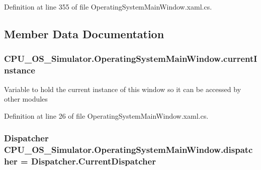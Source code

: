 Definition at line 355 of file Operating\+System\+Main\+Window.\+xaml.\+cs.



\subsection{Member Data Documentation}
\hypertarget{class_c_p_u___o_s___simulator_1_1_operating_system_main_window_ac659b34226b30276331daba60ec7d439}{}
\subsubsection[{current\+Instance}]{ C\+P\+U\+\_\+\+O\+S\+\_\+\+Simulator.\+Operating\+System\+Main\+Window.\+current\+Instance\hspace{0.3cm}{\ttfamily [static]}}\label{class_c_p_u___o_s___simulator_1_1_operating_system_main_window_ac659b34226b30276331daba60ec7d439}


Variable to hold the current instance of this window so it can be accessed by other modules 



Definition at line 26 of file Operating\+System\+Main\+Window.\+xaml.\+cs.

\hypertarget{class_c_p_u___o_s___simulator_1_1_operating_system_main_window_ac0f8e9dfcaba558927c53e11815fb0fb}{}
\subsubsection[{dispatcher}]{\setlength{\rightskip}{0pt plus 5cm}Dispatcher C\+P\+U\+\_\+\+O\+S\+\_\+\+Simulator.\+Operating\+System\+Main\+Window.\+dispatcher = Dispatcher.\+Current\+Dispatcher\hspace{0.3cm}{\ttfamily [private]}}\label{class_c_p_u___o_s___simulator_1_1_operating_system_main_window_ac0f8e9dfcaba558927c53e11815fb0fb}


